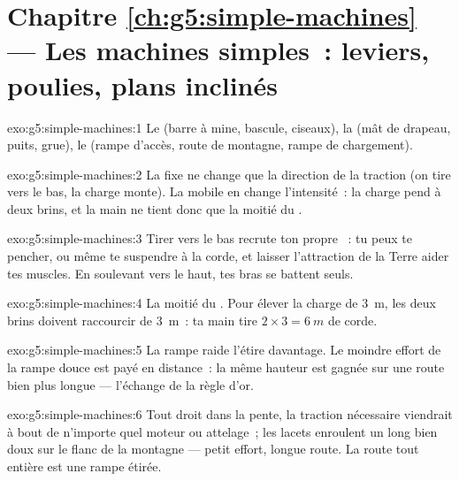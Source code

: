 \section*{Chapitre \ref{ch:g5:simple-machines} --- Les machines simples~: leviers, poulies, plans inclinés}

\begin{solution}{exo:g5:simple-machines:1}
Le  (barre à mine, bascule, ciseaux), la  (mât de
drapeau, puits, grue), le  (rampe d'accès, route de
montagne, rampe de chargement).
\end{solution}

\begin{solution}{exo:g5:simple-machines:2}
La  fixe ne change que la direction de la traction (on tire
vers le bas, la charge monte). La  mobile en change
l'intensité~: la charge pend à deux brins, et la main ne tient donc
que la moitié du .
\end{solution}

\begin{solution}{exo:g5:simple-machines:3}
Tirer vers le bas recrute ton propre ~: tu peux te pencher, ou
même te suspendre à la corde, et laisser l'attraction de la Terre
aider tes muscles. En soulevant vers le haut, tes bras se battent
seuls.
\end{solution}

\begin{solution}{exo:g5:simple-machines:4}
La moitié du . Pour élever la charge de \qty{3}{m}, les deux
brins doivent raccourcir de \qty{3}{m}~: ta main tire
$2 \times 3 = \qty{6}{m}$ de corde.
\end{solution}

\begin{solution}{exo:g5:simple-machines:5}
La rampe raide l'étire davantage. Le moindre effort de la rampe douce
est payé en distance~: la même hauteur est gagnée sur une route bien
plus longue --- l'échange de la règle d'or.
\end{solution}

\begin{solution}{exo:g5:simple-machines:6}
Tout droit dans la pente, la traction nécessaire viendrait à bout de
n'importe quel moteur ou attelage~; les lacets enroulent un long  bien doux sur le flanc de la montagne --- petit effort,
longue route. La route tout entière est une rampe étirée.
\end{solution}

